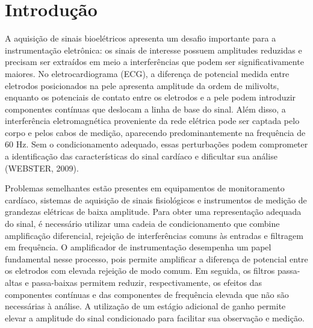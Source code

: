 \documentclass[11pt,a4paper]{article}
\begin{document}
\capa


\section{Introdução}

A aquisição de sinais bioelétricos apresenta um desafio importante para a instrumentação eletrônica: os sinais de interesse possuem amplitudes reduzidas e precisam ser extraídos em meio a interferências que podem ser significativamente maiores. No eletrocardiograma (ECG), a diferença de potencial medida entre eletrodos posicionados na pele apresenta amplitude da ordem de milivolts, enquanto os potenciais de contato entre os eletrodos e a pele podem introduzir componentes contínuas que deslocam a linha de base do sinal. Além disso, a interferência eletromagnética proveniente da rede elétrica pode ser captada pelo corpo e pelos cabos de medição, aparecendo predominantemente na frequência de 60 Hz. Sem o condicionamento adequado, essas perturbações podem comprometer a identificação das características do sinal cardíaco e dificultar sua análise (WEBSTER, 2009).

Problemas semelhantes estão presentes em equipamentos de monitoramento cardíaco, sistemas de aquisição de sinais fisiológicos e instrumentos de medição de grandezas elétricas de baixa amplitude. Para obter uma representação adequada do sinal, é necessário utilizar uma cadeia de condicionamento que combine amplificação diferencial, rejeição de interferências comuns às entradas e filtragem em frequência. O amplificador de instrumentação desempenha um papel fundamental nesse processo, pois permite amplificar a diferença de potencial entre os eletrodos com elevada rejeição de modo comum. Em seguida, os filtros passa-altas e passa-baixas permitem reduzir, respectivamente, os efeitos das componentes contínuas e das componentes de frequência elevada que não são necessárias à análise. A utilização de um estágio adicional de ganho permite elevar a amplitude do sinal condicionado para facilitar sua observação e medição.
\end{document}

